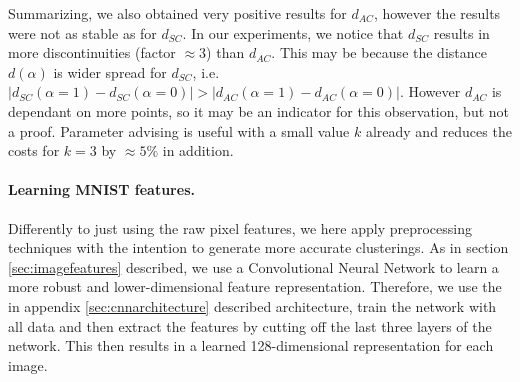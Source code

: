 Summarizing, we also obtained very positive results for $d_{AC}$, however the results were not as stable as for $d_{SC}$. In our experiments, we notice that $d_{SC}$ results in more discontinuities (factor $\approx 3$) than $d_{AC}$. This may be because the distance $d(\alpha)$ is wider spread for $d_{SC}$, i.e. $|d_{SC}(\alpha = 1) - d_{SC}(\alpha = 0)| > |d_{AC}(\alpha = 1) - d_{AC}(\alpha = 0)|$. However $d_{AC}$ is dependant on more points, so it may be an indicator for this observation, but not a proof. Parameter advising is useful with a small value $k$ already and reduces the costs for $k = 3$ by $\approx 5\%$ in addition.

\paragraph{Learning MNIST features.} Differently to just using the raw pixel features, we here apply preprocessing techniques with the intention to generate more accurate clusterings. As in section \ref{sec:imagefeatures} described, we use a Convolutional Neural Network to learn a more robust and lower-dimensional feature representation. Therefore, we use the in appendix \ref{sec:cnnarchitecture} described architecture, train the network with all data and then extract the features by cutting off the last three layers of the network. This then results in a learned 128-dimensional representation for each image.

